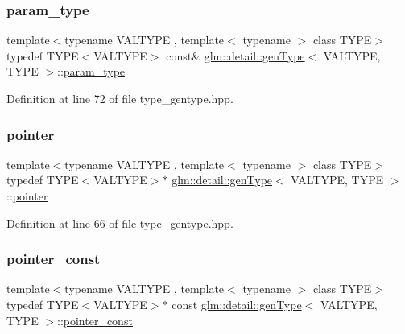 \subsubsection{\texorpdfstring{param\+\_\+type}{param\_type}}
{\footnotesize\ttfamily template$<$typename V\+A\+L\+T\+Y\+PE , template$<$ typename $>$ class T\+Y\+PE$>$ \\
typedef T\+Y\+PE$<$V\+A\+L\+T\+Y\+PE$>$ const\& \hyperlink{structglm_1_1detail_1_1gen_type}{glm\+::detail\+::gen\+Type}$<$ V\+A\+L\+T\+Y\+PE, T\+Y\+PE $>$\+::\hyperlink{structglm_1_1detail_1_1gen_type_a92c8b989f574a63d4e0f5bfc8a4f3a32}{param\+\_\+type}}



Definition at line 72 of file type\+\_\+gentype.\+hpp.

\mbox{\label{structglm_1_1detail_1_1gen_type_a0b4ddd0af4ae5665c60055e5b622808e}} 
\subsubsection{\texorpdfstring{pointer}{pointer}}
{\footnotesize\ttfamily template$<$typename V\+A\+L\+T\+Y\+PE , template$<$ typename $>$ class T\+Y\+PE$>$ \\
typedef T\+Y\+PE$<$V\+A\+L\+T\+Y\+PE$>$$\ast$ \hyperlink{structglm_1_1detail_1_1gen_type}{glm\+::detail\+::gen\+Type}$<$ V\+A\+L\+T\+Y\+PE, T\+Y\+PE $>$\+::\hyperlink{structglm_1_1detail_1_1gen_type_a0b4ddd0af4ae5665c60055e5b622808e}{pointer}}



Definition at line 66 of file type\+\_\+gentype.\+hpp.

\mbox{\label{structglm_1_1detail_1_1gen_type_a4d7745054035d7efed18ec1d7215bbf0}} 
\subsubsection{\texorpdfstring{pointer\+\_\+const}{pointer\_const}}
{\footnotesize\ttfamily template$<$typename V\+A\+L\+T\+Y\+PE , template$<$ typename $>$ class T\+Y\+PE$>$ \\
typedef T\+Y\+PE$<$V\+A\+L\+T\+Y\+PE$>$$\ast$ const \hyperlink{structglm_1_1detail_1_1gen_type}{glm\+::detail\+::gen\+Type}$<$ V\+A\+L\+T\+Y\+PE, T\+Y\+PE $>$\+::\hyperlink{structglm_1_1detail_1_1gen_type_a4d7745054035d7efed18ec1d7215bbf0}{pointer\+\_\+const}}



